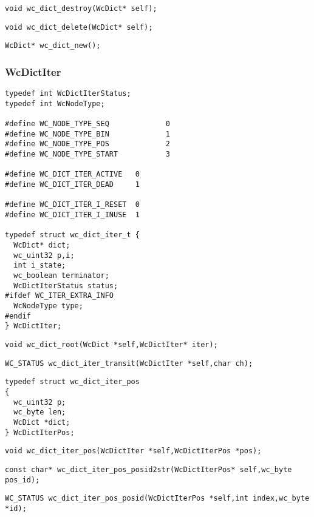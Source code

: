 \documentclass{book}
\begin{document}
\begin{verbatim}
void wc_dict_destroy(WcDict* self);
\end{verbatim}

\begin{verbatim}
void wc_dict_delete(WcDict* self);
\end{verbatim}

\begin{verbatim}
WcDict* wc_dict_new();
\end{verbatim}

\subsubsection{WcDictIter}

\begin{verbatim}
typedef int WcDictIterStatus;
typedef int WcNodeType;

#define WC_NODE_TYPE_SEQ             0
#define WC_NODE_TYPE_BIN             1
#define WC_NODE_TYPE_POS             2
#define WC_NODE_TYPE_START           3

#define WC_DICT_ITER_ACTIVE   0
#define WC_DICT_ITER_DEAD     1

#define WC_DICT_ITER_I_RESET  0
#define WC_DICT_ITER_I_INUSE  1

typedef struct wc_dict_iter_t {
  WcDict* dict;
  wc_uint32 p,i;
  int i_state;
  wc_boolean terminator;
  WcDictIterStatus status;
#ifdef WC_ITER_EXTRA_INFO
  WcNodeType type;
#endif
} WcDictIter;
\end{verbatim}

\begin{verbatim}
void wc_dict_root(WcDict *self,WcDictIter* iter);
\end{verbatim}

\begin{verbatim}
WC_STATUS wc_dict_iter_transit(WcDictIter *self,char ch);
\end{verbatim}

\begin{verbatim}
typedef struct wc_dict_iter_pos 
{
  wc_uint32 p;
  wc_byte len;
  WcDict *dict;
} WcDictIterPos;
\end{verbatim}

\begin{verbatim}
void wc_dict_iter_pos(WcDictIter *self,WcDictIterPos *pos);
\end{verbatim}

\begin{verbatim}
const char* wc_dict_iter_pos_posid2str(WcDictIterPos* self,wc_byte pos_id);
\end{verbatim}

\begin{verbatim}
WC_STATUS wc_dict_iter_pos_posid(WcDictIterPos *self,int index,wc_byte *id);
\end{verbatim}
\end{document}
